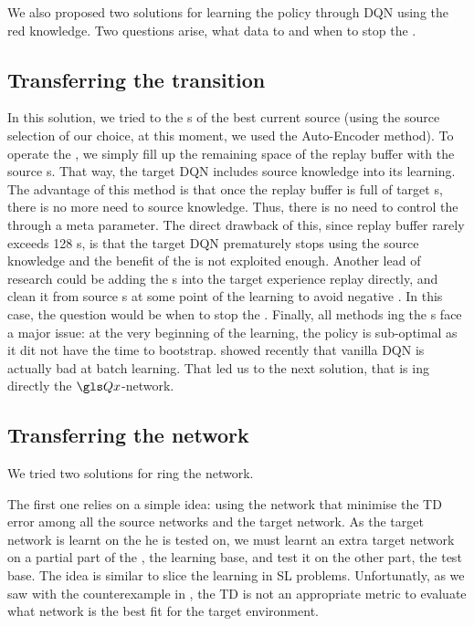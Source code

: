 We also proposed two solutions for learning the policy through \gls{DQN} using the red knowledge. Two questions arise, what data to  and when to stop the .

\subsection{Transferring the transition}

In this solution, we tried to  the s of the best current source  (using the source selection of our choice, at this moment, we used the Auto-Encoder method). To operate the , we simply fill up the remaining space of the replay buffer with the source s. That way, the target \gls{DQN} includes source knowledge into its learning. The advantage of this method is that once the replay buffer is full of target s, there is no more need to  source knowledge. Thus, there is no need to control the  through a meta parameter. The direct drawback of this, since replay buffer rarely exceeds 128 s, is that the target \gls{DQN} prematurely stops using the source knowledge and the benefit of the  is not exploited enough. Another lead of research could be adding the s into the target experience replay directly, and clean it from source s at some point of the learning to avoid negative . In this case, the question would be when to stop the . Finally, all methods ing the s face a major issue: at the very beginning of the learning, the policy is sub-optimal as it dit not have the time to bootstrap. \textcite{laroche2019} showed recently that vanilla \gls{DQN} is actually bad at batch learning. That led us to the next solution, that is ing directly the $\Q$-network.


\subsection{Transferring the network}

We tried two solutions for ring the network.

The first one relies on a simple idea: using the network that minimise the \gls{TD} error among all the source networks and the target network. As the target  network is learnt on the  he is tested on, we must learnt an extra target network on a partial part of the , the learning base, and test it on the other part, the test base. The idea is similar to slice the learning  in \acrfull{SL} problems. Unfortunatly, as we saw with the counterexample in , the \gls{TD} is not an appropriate metric to evaluate what network is the best fit for the target environment.

